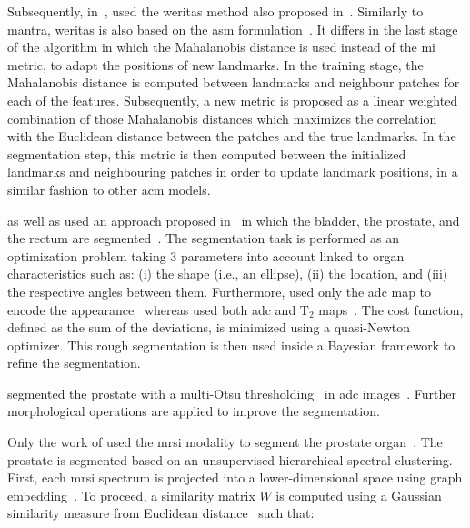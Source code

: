 Subsequently, \citeauthor{Viswanath2012} in~\cite{Viswanath2012}, used the \ac{weritas} method also proposed in~\citeauthor{Toth2009}.
Similarly to \ac{mantra}, \ac{weritas} is also based on the \ac{asm} formulation~\cite{Toth2009}.
It differs in the last stage of the algorithm in which the Mahalanobis distance is used instead of the \ac{mi} metric, to adapt the positions of new landmarks.
In the training stage, the Mahalanobis distance is computed between landmarks and neighbour patches for each of the features.
Subsequently, a new metric is proposed as a linear weighted combination of those Mahalanobis distances which maximizes the correlation with the Euclidean distance between the patches and the true landmarks.
In the segmentation step, this metric is then computed between the initialized landmarks and neighbouring patches in order to update landmark positions, in a similar fashion to other \ac{acm} models.

\citeauthor{Litjens2011} as well as \citeauthor{Vos2012} used an approach proposed in~\cite{Huisman2010} in which the bladder, the prostate, and the rectum are segmented~\cite{Litjens2011,Vos2012}.
The segmentation task is performed as an optimization problem taking 3 parameters into account linked to organ characteristics such as: (i) the shape (i.e., an ellipse), (ii) the location, and (iii) the respective angles between them.
Furthermore, \citeauthor{Litjens2011} used only the \ac{adc} map to encode the appearance~\cite{Litjens2011} whereas \citeauthor{Vos2012} used both \ac{adc} and T$_2$ maps~\cite{Vos2012}.
The cost function, defined as the sum of the deviations, is minimized using a quasi-Newton optimizer.
This rough segmentation is then used inside a Bayesian framework to refine the segmentation.

\citeauthor{giannini2015fully} segmented the prostate with a multi-Otsu thresholding~\cite{otsu1975threshold} in \ac{adc} images~\cite{giannini2015fully}.
Further morphological operations are applied to improve the segmentation.

Only the work of \citeauthor{Tiwari2009} used the \ac{mrsi} modality to segment the prostate organ~\cite{Tiwari2009}.
The prostate is segmented based on an unsupervised hierarchical spectral clustering.
First, each \ac{mrsi} spectrum is projected into a lower-dimensional space using graph embedding~\cite{Shi2000}.
To proceed, a similarity matrix $W$ is computed using a Gaussian similarity measure from Euclidean distance~\cite{Belkin2001} such that:

